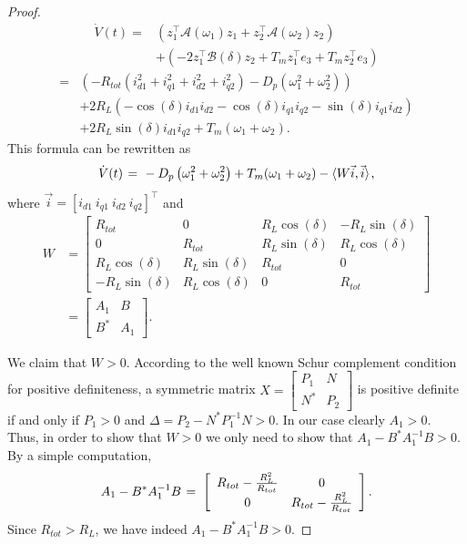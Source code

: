 \documentclass[letterpaper,10pt,conference]{ieeeconf}
\newcommand{\BE}{\begin{equation}}
\newcommand{\BEQ}[1]{\BE\label{#1}} %
\renewcommand{\o}    {{\omega}}
\newcommand{\m}      {{\hbox{\hskip 1pt}}}
\newcommand{\Amscr}  {{\mathcal{A}}}
\newcommand{\Bmscr}  {{\mathcal{B}}}
\begin{document}
\begin{proof}
$$ \begin{aligned} \dot{V}(t) =& \left(z_1^\top\Amscr(\o_1)z_1+z_2
   ^\top\Amscr(\o_2)z_2\right)\\ &+ \left(-2z_1^\top \Bmscr(\delta)
   z_2 + T_m z_1^\top e_3 + T_m z_2^\top e_3\right) \end{aligned}$$
$$ \begin{aligned} =& \left(-R_{tot}\left(i_{d1}^2 +
   i_{q1}^2+i_{d2}^2+i_{q2}^2 \right)-D_p \left(\o_1^2+\o_2^2\right)
   \right) \\ & +2 R_L \left(-\cos(\delta)i_{d1}i_{d2}-\cos(\delta)
   i_{q1}i_{q2}-\sin(\delta)i_{q1}i_{d2}\right)\\ &+2 R_L
   \sin(\delta)i_{d1}i_{q2} + T_m(\o_1+\o_2).\end{aligned}$$
This formula can be rewritten as
\BEQ{Jyun_back_from_China}
   \dot{V}(t) \m=\m -D_p\left( \o_1^2+\o_2^2\right) + T_m(\o_1+\o_2)
   -\langle W\vec{i},\vec{i} \rangle \m,
\end{equation}
where $\vec{i}=[i_{d1}\ i_{q1}\ i_{d2}\ i_{q2}]^\top$ and
$$ \begin{aligned} W &=\left[\begin{array}{cc|cc} R_{tot} & 0 & R_L 
   \cos(\delta) & -R_L \sin(\delta) \\ 0 & R_{tot} & R_L \sin(\delta)
   & R_L\cos(\delta) \\ \hline R_L\cos(\delta) & R_L\sin(\delta) & 
   R_{tot} & 0 \\ -R_L \sin(\delta) & R_L\cos(\delta) & 0 & R_{tot} 
   \end{array}\right]\\ &= \left[ \begin{array}{c|c} A_1 & B \\ 
   \hline B^* & A_1 \end{array} \right].\end{aligned}$$

We claim that $W>0$. According to the well known Schur complement
condition for positive definiteness, a symmetric matrix $X = \left[
\begin{array}{c|c} P_1 & N \\ \hline N^* & P_2 \end{array}\right]$ is
positive definite if and only if $P_1>0$ and $\Delta=P_2-N^*P_1^{-1}
N>0$. In our case clearly $A_1>0$. Thus, in order to show that $W>0$
we only need to show that $A_1-B^*A_1^{-1}B>0$. By a simple 
computation,
$$ A_1-B^*A_1^{-1}B \m=\m \left[\begin{array}{cc}
   R_{tot}-\frac{R_L^2}{R_{tot}} & 0  \\ 
   0 & R_{tot}-\frac{R_L^2}{R_{tot}} \end{array}\right].$$
Since $R_{tot}>R_L$, we have indeed $A_1-B^*A_1^{-1}B>0$. 


\end{proof}
\end{document}
